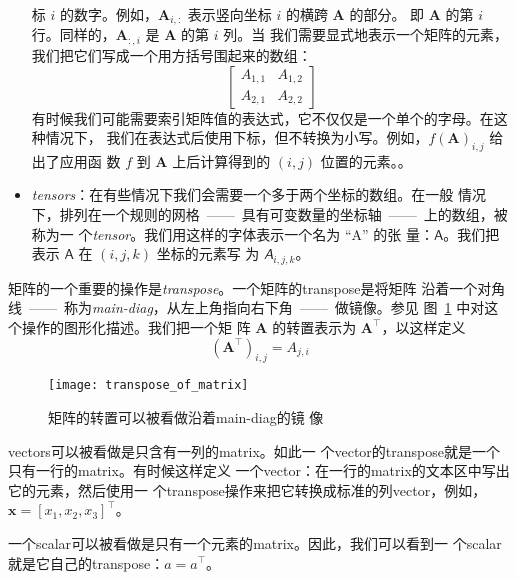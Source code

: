 \begin{itemize}
  标 $i$ 的数字。例如，$\pmb{A}_{i,:}$ 表示竖向坐标 $i$ 的横跨 $\pmb{A}$ 的部分。
  即 $\pmb{A}$ 的第 $i$ 行。同样的，$\pmb{A}_{:,i}$ 是 $\pmb{A}$ 的第 $i$ 列。当
  我们需要显式地表示一个矩阵的元素，我们把它们写成一个用方括号围起来的数组：
  \begin{equation}
    \begin{bmatrix}A_{1,1} & A_{1,2} \\ A_{2,1} & A_{2,2}\end{bmatrix}
    \label{eq:matrix_example}
  \end{equation}
  有时候我们可能需要索引矩阵值的表达式，它不仅仅是一个单个的字母。在这种情况下，
  我们在表达式后使用下标，但不转换为小写。例如，$f(\pmb{A})_{i,j}$ 给出了应用函
  数 $f$ 到 $\pmb{A}$ 上后计算得到的 $(i,j)$ 位置的元素。。
\item \emph{\gls{tensors}}：在有些情况下我们会需要一个多于两个坐标的数组。在一般
  情况下，排列在一个规则的网格~——~具有可变数量的坐标轴~——~上的数组，被称为一
  个\emph{\gls{tensor}}。我们用这样的字体表示一个名为 ``A'' 的张
  量：$\pmb{\mathsf{A}}$。我们把表示 $\pmb{\mathsf{A}}$ 在 $(i,j,k)$ 坐标的元素写
  为 $\mathsfit{A}_{i,j,k}$。
\end{itemize}

矩阵的一个重要的操作是\emph{\gls{transpose}}。一个矩阵的\gls*{transpose}是将矩阵
沿着一个对角线~——~称为\emph{\gls{main-diag}}，从左上角指向右下角~——~做镜像。参见
图~\ref{fig:transpose_of_matrix} 中对这个操作的图形化描述。我们把一个矩
阵 $\pmb{A}$ 的转置表示为 $\pmb{A}^{\top}$，以这样定义
\begin{equation}
  (\pmb{A}^{\top})_{i,j} = A_{j,i}
  \label{eq:transpose_of_matrix}
\end{equation}

\begin{figure}[h]
  \centering
  \texttt{[image: transpose\_of\_matrix]}
  \caption{矩阵的转置可以被看做沿着\gls*{main-diag}的镜
    像\label{fig:transpose_of_matrix}}
\end{figure}

\gls*{vectors}可以被看做是只含有一列的\gls*{matrix}。如此一
个\gls*{vector}的\gls*{transpose}就是一个只有一行的\gls*{matrix}。有时候这样定义
一个\gls*{vector}：在一行的\gls*{matrix}的文本区中写出它的元素，然后使用一
个\gls*{transpose}操作来把它转换成标准的列\gls*{vector}，例如，$\pmb{x} = [x_1,
x_2, x_3]^{\top}$。

一个\gls*{scalar}可以被看做是只有一个元素的\gls*{matrix}。因此，我们可以看到一
个\gls*{scalar}就是它自己的\gls*{transpose}：$a = a^{\top}$。

